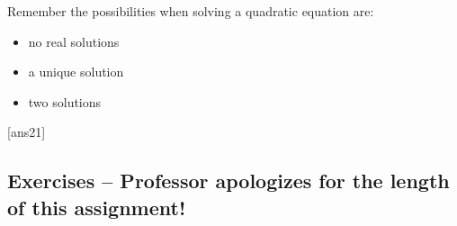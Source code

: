 \documentclass{amsbook}
\numberwithin{section}{chapter}
\numberwithin{equation}{chapter}
\begin{document}
Remember the possibilities when solving a quadratic equation are:
\begin{itemize}
	\item no real solutions
	\item a unique solution
	\item two solutions
\end{itemize}

[ans21]
\subsection*{Exercises -- Professor apologizes for the length of this assignment!} \hfill

\begin{comment}
Factor completely using integers. Check your answer by multiplication.

\begin{multicols}{2}



\end{comment}
\end{document}
